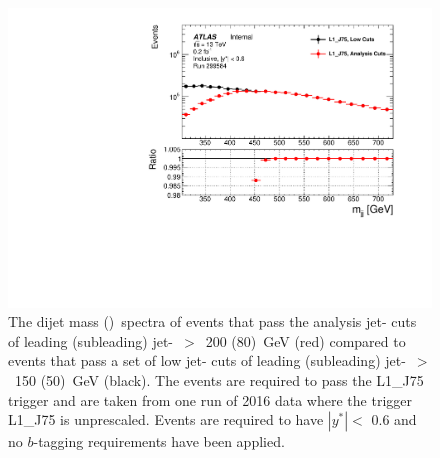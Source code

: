 \begin{figure}[!ht]
  \begin{center}
    \includegraphics[width=0.62\linewidth, angle=0]{figs/Dibjet/LowMass/evt-mjj_yStar0p6.pdf}
  \end{center}
  \vspace{-1em}
  \caption[Derivations of the dijet mass cut for the \lm{} data-set event selection.]
          {The dijet mass (\mjj{})~spectra of events that pass the analysis jet-\pT{} cuts of leading (subleading) jet-\pT{}~$>$~200 (80)~GeV (red)
    compared to events that pass a set of low jet-\pT{} cuts of leading (subleading) jet-\pT{}~$>$~150 (50)~GeV (black).
    The events are required to pass the L1\_J75 trigger and are taken from one run of 2016 data where the trigger L1\_J75 is unprescaled.
    Events are required to have $|y^*| <$ 0.6 and no $b$-tagging requirements have been applied.}
     \label{fig:evt-lowmass_turnon}
\end{figure}



